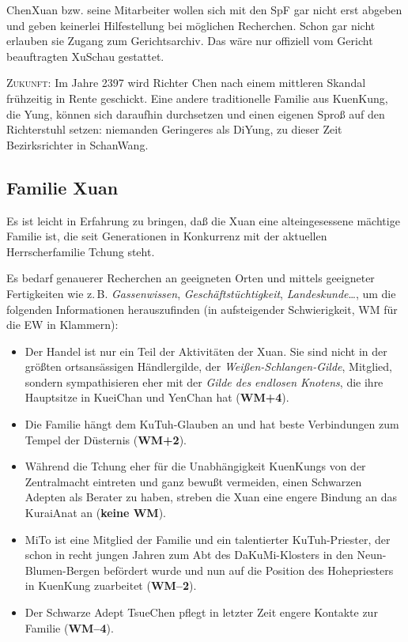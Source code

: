 \documentclass[
a4paper,
twoside,
DIV=calc,
BCOR=4mm,
fontsize=9pt,
twocolumn=on,
titlepage=on,
parskip=half
]{scrartcl}
\begin{document}
ChenXuan bzw. seine Mitarbeiter wollen sich mit den SpF gar nicht erst
abgeben und geben keinerlei Hilfestellung bei möglichen
Recherchen. Schon gar nicht erlauben sie Zugang zum
Gerichtsarchiv. Das wäre nur offiziell vom Gericht beauftragten
XuSchau gestattet.

\textsc{Zukunft:} Im Jahre 2397 wird Richter Chen nach einem mittleren
Skandal frühzeitig in Rente geschickt. Eine andere traditionelle
Familie aus KuenKung, die Yung, können sich daraufhin durchsetzen und
einen eigenen Sproß auf den Richterstuhl setzen: niemanden Geringeres
als DiYung, zu dieser Zeit Bezirksrichter in SchanWang.

\subsection{Familie Xuan}

Es ist leicht in Erfahrung zu bringen, daß die Xuan eine
alteingesessene mächtige Familie ist, die seit Generationen in
Konkurrenz mit der aktuellen Herrscherfamilie Tchung steht.

Es bedarf genauerer Recherchen an geeigneten Orten und mittels
geeigneter Fertigkeiten wie z.\,B. \emph{Gassenwissen},
\emph{Geschäftstüchtigkeit}, \emph{Landeskunde}\dots, um die folgenden
Informationen herauszufinden (in aufsteigender Schwierigkeit, WM für
die EW in Klammern):

\begin{itemize}
\item Der Handel ist nur ein Teil der Aktivitäten der Xuan. Sie sind
  nicht in der größten ortsansässigen Händlergilde, der
  \emph{Weißen-Schlangen-Gilde}, Mitglied, sondern sympathisieren eher
  mit der \emph{Gilde des endlosen Knotens}, die ihre Hauptsitze in
  KueiChan und YenChan hat (\textbf{WM+4}).
\item Die Familie hängt dem KuTuh-Glauben an und hat beste
  Verbindungen zum Tempel der Düsternis (\textbf{WM+2}).
\item Während die Tchung eher für die Unabhängigkeit KuenKungs von der
  Zentralmacht eintreten und ganz bewußt vermeiden, einen Schwarzen
  Adepten als Berater zu haben, streben die Xuan eine engere Bindung
  an das KuraiAnat an (\textbf{keine WM}).
\item MiTo ist eine Mitglied der Familie und ein talentierter
  KuTuh-Priester, der schon in recht jungen Jahren zum Abt des
  DaKuMi-Klosters in den Neun-Blumen-Bergen befördert wurde und nun
  auf die Position des Hohepriesters in KuenKung zuarbeitet (\textbf{WM--2}).
\item Der Schwarze Adept TsueChen pflegt in letzter Zeit engere
  Kontakte zur Familie (\textbf{WM--4}).
\end{itemize}
\end{document}
